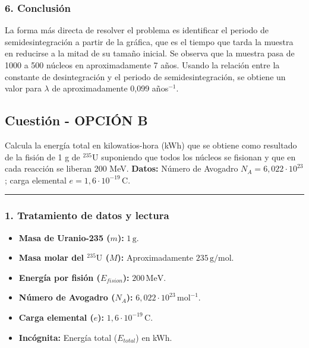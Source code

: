 \subsubsection*{6. Conclusión}
\begin{cajaconclusion}
La forma más directa de resolver el problema es identificar el periodo de semidesintegración a partir de la gráfica, que es el tiempo que tarda la muestra en reducirse a la mitad de su tamaño inicial. Se observa que la muestra pasa de 1000 a 500 núcleos en aproximadamente 7 años. Usando la relación entre la constante de desintegración y el periodo de semidesintegración, se obtiene un valor para $\lambda$ de aproximadamente 0,099 años$^{-1}$.
\end{cajaconclusion}

\newpage
\subsection{Cuestión - OPCIÓN B}
\label{subsec:VIB_2012_sep}

\begin{cajaenunciado}
Calcula la energía total en kilowatios-hora (kWh) que se obtiene como resultado de la fisión de 1 g de ${}^{235}\text{U}$ suponiendo que todos los núcleos se fisionan y que en cada reacción se liberan 200 MeV.
\textbf{Datos:} Número de Avogadro $N_A=6,022\cdot10^{23}$; carga elemental $e=1,6\cdot10^{-19}\,\text{C}$.
\end{cajaenunciado}
\hrule

\subsubsection*{1. Tratamiento de datos y lectura}
\begin{itemize}
    \item \textbf{Masa de Uranio-235 ($m$):} $1\,\text{g}$.
    \item \textbf{Masa molar del ${}^{235}\text{U}$ ($M$):} Aproximadamente $235\,\text{g/mol}$.
    \item \textbf{Energía por fisión ($E_{fision}$):} $200\,\text{MeV}$.
    \item \textbf{Número de Avogadro ($N_A$):} $6,022\cdot10^{23}\,\text{mol}^{-1}$.
    \item \textbf{Carga elemental ($e$):} $1,6\cdot10^{-19}\,\text{C}$.
    \item \textbf{Incógnita:} Energía total ($E_{total}$) en kWh.
\end{itemize}

